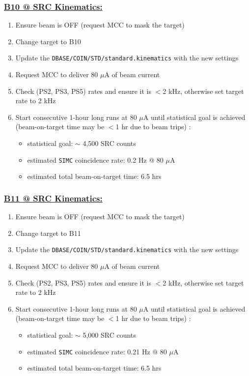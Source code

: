\documentclass{article}
\begin{document}
\subsubsection*{\underline{B10 @ SRC Kinematics:}}
\begin{enumerate}
\item Ensure beam is OFF (request MCC to mask the target)
\item Change target to B10
\item Update the \texttt{DBASE/COIN/STD/standard.kinematics} with the new settings
\item Request MCC to deliver 80 $\mu$A of beam current
\item Check (PS2, PS3, PS5) rates and ensure it is $<$2 kHz, otherwise set target rate to 2 kHz
\item Start consecutive 1-hour long runs at 80 $\mu$A until statistical goal is achieved \\ (beam-on-target time may be $<$1 hr due to beam trips) :
\begin{itemize}
    \item statistical goal: $\sim$ 4,500 SRC counts
    \item estimated \texttt{SIMC} coincidence rate: 0.2 Hz @ 80 $\mu$A
    \item estimated total beam-on-target time: 6.5 hrs
\end{itemize}
\end{enumerate}

\subsubsection*{\underline{B11 @ SRC Kinematics:}}
\begin{enumerate}
\item Ensure beam is OFF (request MCC to mask the target)
\item Change target to B11
\item Update the \texttt{DBASE/COIN/STD/standard.kinematics} with the new settings
\item Request MCC to deliver 80 $\mu$A of beam current
\item Check (PS2, PS3, PS5) rates and ensure it is $<$2 kHz, otherwise set target rate to 2 kHz
\item Start consecutive 1-hour long runs at 80 $\mu$A until statistical goal is achieved \\ (beam-on-target time may be $<$1 hr due to beam trips) :
\begin{itemize}
    \item statistical goal: $\sim$ 5,000 SRC counts
    \item estimated \texttt{SIMC} coincidence rate: 0.21 Hz @ 80 $\mu$A
    \item estimated total beam-on-target time: 6.5 hrs
\end{itemize}
\end{enumerate}
\end{document}
